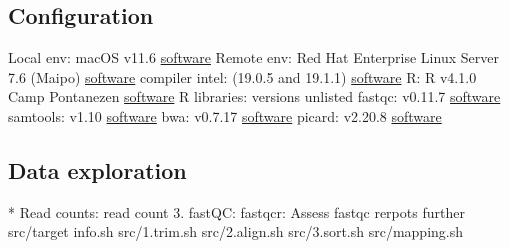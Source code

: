 \markdownRendererUlEndTight \markdownRendererInterblockSeparator
{}\subsection{Configuration}\markdownRendererInterblockSeparator
{}\markdownRendererUlBeginTight
\markdownRendererUlItem Local env: macOS v11.6 \href{https://support.apple.com/macos}{software}\markdownRendererUlItemEnd 
\markdownRendererUlItem Remote env: Red Hat Enterprise Linux Server 7.6 (Maipo) \href{https://www.redhat.com/en/technologies/linux-platforms/enterprise-linux}{software}\markdownRendererUlItemEnd 
\markdownRendererUlItem compiler intel: (19.0.5 and 19.1.1) \href{https://www.intel.com/content/www/us/en/developer/tools/oneapi/commercial-base-hpc.html#gs.ppyt3x}{software}\markdownRendererUlItemEnd 
\markdownRendererUlItem R: R v4.1.0 Camp Pontanezen \href{https://www.r-project.org}{software}\markdownRendererUlItemEnd 
\markdownRendererUlItem R libraries: versions unlisted\markdownRendererUlItemEnd 
\markdownRendererUlItem fastqc: v0.11.7 \href{https://www.bioinformatics.babraham.ac.uk/projects/fastqc/}{software}\markdownRendererUlItemEnd 
\markdownRendererUlItem samtools: v1.10 \href{https://www.htslib.org}{software}\markdownRendererUlItemEnd 
\markdownRendererUlItem bwa: v0.7.17 \href{https://janis.readthedocs.io/en/latest/tools/bioinformatics/bwa/bwamem.html}{software}\markdownRendererUlItemEnd 
\markdownRendererUlItem picard: v2.20.8 \href{http://broadinstitute.github.io/picard/}{software}\markdownRendererUlItemEnd 
\markdownRendererUlEndTight \markdownRendererInterblockSeparator
{}\subsection{Data exploration} * Read counts:\markdownRendererInterblockSeparator
{}read count 3. fastQC:\markdownRendererInterblockSeparator
{}\markdownRendererOlBeginTight
{}fastqcr: Assess fastqc rerpots further\markdownRendererOlItemEnd 
{}src/target info.sh\markdownRendererOlItemEnd 
{}src/1.trim.sh\markdownRendererOlItemEnd 
{}src/2.align.sh\markdownRendererOlItemEnd 
{}src/3.sort.sh\markdownRendererOlItemEnd 
{}src/mapping.sh\markdownRendererOlItemEnd 
\markdownRendererOlEndTight \relax